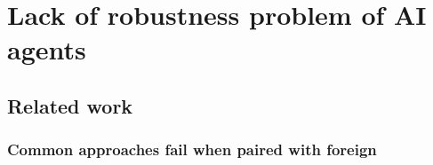 \chapter{Lack of robustness problem of AI agents}
\section{Related work}
\subsection*{Common approaches fail when paired with foreign }



